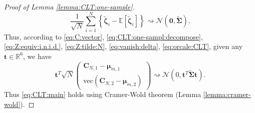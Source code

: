 \documentclass[12pt,letterpaper]{article}
\begin{document}
\begin{proof}[Proof of Lemma \ref{lemma:CLT:one-sample}]
\begin{equation}\label{eq:orcale:CLT}
\frac{1}{\sqrt{N}}\sum_{i=1}^N\left\{\tilde{\boldsymbol{\zeta}}_i-\mathbb{E}\left[\tilde{\boldsymbol{\zeta}}_i\right]\right\}\rightsquigarrow\mathcal{N}\left(\mathbf{0},\widetilde{\boldsymbol{\Sigma}}\right).
\end{equation}
Thus, according to \eqref{eq:C:vector}, \eqref{eq:CLT:one-sampl:decompose}, \eqref{eq:Z:equiv:i.n.i.d.}, \eqref{eq:Z:tilde:N}, \eqref{eq:vanish:delta}, \eqref{eq:orcale:CLT}, given any $\mathbf{t}\in\mathbb{R}^6$, we have 
$$\mathbf{t}^T\sqrt{N}\begin{pmatrix}
\mathbf{C}_{N,1}-\boldsymbol{\mu}_{m,1}\\
\mathrm{vec}(\mathbf{C}_{N,2}-\boldsymbol{\mu}_{m,2})
\end{pmatrix}\rightsquigarrow\mathcal{N}\left(0,\mathbf{t}^T\widetilde{\boldsymbol{\Sigma}}\mathbf{t}\right).$$
Thus \eqref{eq:CLT:main} holds using Cramer-Wold theorem (Lemma \ref{lemma:cramer-wold}).
\end{proof}
\end{document}
